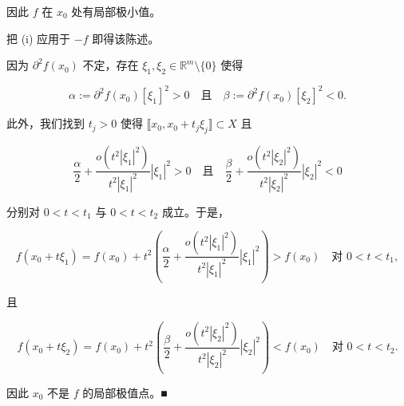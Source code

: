 \begin{theorem}
因此 $ f $ 在 $ x_{0} $ 处有局部极小值。

\begin{subitems}
\item[（ii）]

把 (i) 应用于 $ -f $ 即得该陈述。

\item[（iii）]

因为 $ \partial^{2}f(x_{0}) $ 不定，存在 $ \xi_{1}, \xi_{2} \in \mathbb{R}^{m}\setminus\{0\} $ 使得

\[
\alpha := \partial^{2}f(x_{0})[\xi_{1}]^{2} > 0 \quad \text{且} \quad \beta := \partial^{2}f(x_{0})[\xi_{2}]^{2} < 0 .
\]

此外，我们找到 $ t_{j} > 0 $ 使得 $ \llbracket x_{0}, x_{0} + t_{j}\xi_{j} \rrbracket \subset X $ 且

\[
\frac{\alpha}{2} + \frac{o(t^{2}|\xi_{1}|^{2})}{t^{2}|\xi_{1}|^{2}}|\xi_{1}|^{2} > 0 \quad \text{且} \quad \frac{\beta}{2} + \frac{o(t^{2}|\xi_{2}|^{2})}{t^{2}|\xi_{2}|^{2}}|\xi_{2}|^{2} < 0
\]

分别对 $ 0 < t < t_{1} $ 与 $ 0 < t < t_{2} $ 成立。于是，

\[
f(x_{0} + t\xi_{1}) = f(x_{0}) + t^{2}\left( \frac{\alpha}{2} + \frac{o(t^{2}|\xi_{1}|^{2})}{t^{2}|\xi_{1}|^{2}}|\xi_{1}|^{2} \right) > f(x_{0}) \quad \text{对 } 0 < t < t_{1} ,
\]

且

\[
f(x_{0} + t\xi_{2}) = f(x_{0}) + t^{2}\left( \frac{\beta}{2} + \frac{o(t^{2}|\xi_{2}|^{2})}{t^{2}|\xi_{2}|^{2}}|\xi_{2}|^{2} \right) < f(x_{0}) \quad \text{对 } 0 < t < t_{2} .
\]

因此 $ x_{0} $ 不是 $ f $ 的局部极值点。\nobreak\hspace{0.35em}■

\end{subitems}

\end{theorem}

